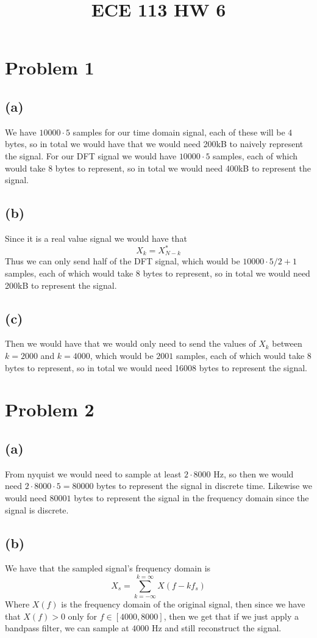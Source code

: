 
\title{ECE 113 HW 6}

\maketitle
\section*{Problem 1}
\subsection*{(a)}
We have $10000\cdot 5$ samples for our 
time domain signal, each of these will be $4$ bytes, 
so in total we would have that we would need 200kB to 
naively represent the signal. For our 
DFT signal we would have $10000 \cdot 5$ samples, each of
which would take $8$ bytes to represent, so in total 
we would need 400kB to represent the signal.
\subsection*{(b)}
Since it is a real value signal we would have that 
$$X_k=X_{N-k}^*$$
Thus we can only send half of the DFT signal,
which would be $10000 \cdot 5/2+1$ samples, each of which
would take $8$ bytes to represent, so in total we would
need 200kB to represent the signal.
\subsection*{(c)}
Then we would have that we would only 
need to send the values of 
$X_k$ between $k=2000$ and $k=4000$, which would be
$2001$ samples, each of which would take $8$ bytes to
represent, so in total we would need 16008 bytes to
represent the signal.
\section*{Problem 2}
\subsection*{(a)}
From nyquist we would need to sample at least $2\cdot 8000$ Hz, 
so then we would need $2\cdot 8000\cdot 5=80000$ bytes to represent
the signal in discrete time. Likewise we would need $80001$ bytes 
to represent the signal in the frequency domain since the signal is discrete.
\subsection*{(b)}
We have that the sampled signal's frequency domain is 
$$X_s=\sum_{k=-\infty}^{k=\infty}X(f-kf_s)$$
Where $X(f)$ is the frequency domain of the original signal, then 
since we have that $X(f)>0$ only for $f\in[4000,8000]$, 
then we get that if we just apply a  bandpass filter, we 
can sample at $4000$ Hz and still reconstruct the signal.
